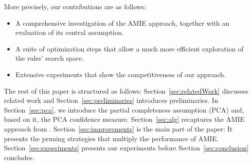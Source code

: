 \noindent More precisely, our contributions are as follows:
\begin{itemize}[noitemsep,nolistsep,leftmargin=0.4cm,midpenalty=0,label=$\bullet$]
\item A comprehensive investigation of the AMIE approach, together with an evaluation of its central assumption.
\item A suite of optimization steps that allow a much more efficient exploration of the rules' search space.
\item Extensive experiments that show the competitiveness of our approach.
\end{itemize}
The rest of this paper is structured as follows: Section~\ref{sec:relatedWork} discusses related work and Section~\ref{sec:preliminaries} introduces preliminaries.
In Section~\ref{sec:pca}, we introduce the partial completeness assumption (PCA) and, based on it, the PCA confidence measure.
Section~\ref{sec:alg} recaptures the AMIE approach from \cite{amie}.
Section~\ref{sec:improvements} is the main part of the paper: It presents the pruning strategies that multiply the performance of AMIE.
Section~\ref{sec:experiments} presents our experiments before Section~\ref{sec:conclusion} concludes.





